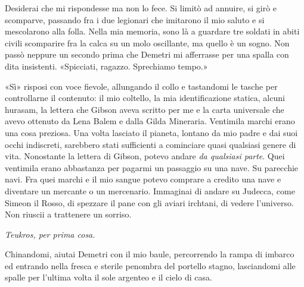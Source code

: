 Desiderai che mi rispondesse ma non lo fece. Si limitò ad annuire, si
girò e scomparve, passando fra i due legionari che imitarono il mio
saluto e si mescolarono alla folla. Nella mia memoria, sono là a
guardare tre soldati in abiti civili scomparire fra la calca su un molo
oscillante, ma quello è un sogno. Non passò neppure un secondo prima che
Demetri mi afferrasse per una spalla con dita insistenti. «Spicciati,
ragazzo. Sprechiamo tempo.»

«Sì» risposi con voce fievole, allungando il collo e tastandomi le
tasche per controllarne il contenuto: il mio coltello, la mia
identificazione statica, alcuni hurasam, la lettera che Gibson aveva
scritto per me e la carta universale che avevo ottenuto da Lena Balem e
dalla Gilda Mineraria. Ventimila marchi erano una cosa preziosa. Una
volta lasciato il pianeta, lontano da mio padre e dai suoi occhi
indiscreti, sarebbero stati sufficienti a cominciare quasi qualsiasi
genere di vita. Nonostante la lettera di Gibson, potevo andare \emph{da
	qualsiasi parte}. Quei ventimila erano abbastanza per pagarmi un
passaggio su una nave. Su parecchie navi. Fra quei marchi e il mio
sangue potevo comprare a credito una nave e diventare un mercante o un
mercenario. Immaginai di andare su Judecca, come Simeon il Rosso, di
spezzare il pane con gli aviari irchtani, di vedere l'universo. Non
riuscii a trattenere un sorriso.

\emph{Teukros, per prima cosa.}

Chinandomi, aiutai Demetri con il mio baule, percorrendo la rampa di
imbarco ed entrando nella fresca e sterile penombra del portello stagno,
lasciandomi alle spalle per l'ultima volta il sole argenteo e il cielo
di casa.

